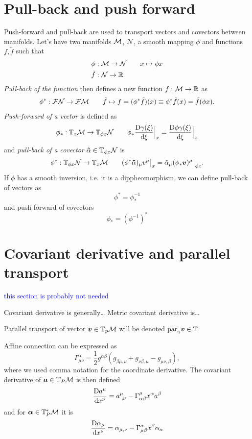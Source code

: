 \section{Pull-back and push forward}
Push-forward and pull-back are used to transport vectors and covectors between manifolds. Let's have two manifolds $\mathcal{M}$, $\mathcal{N}$, a smooth mapping $\phi$ and functions $f,\tilde f$ such that
\begin{align*}
    \phi&:\mathcal{M}\rightarrow \mathcal{N}\qquad x\mapsto \phi x\\
    \tilde f&:\mathcal{N}\rightarrow \mathbb{R} 
\end{align*}
\emph{Pull-back of the function} then defines a new function $
f:\mathcal{M}\rightarrow \mathbb{R} $ as
$$\phi^*:\mathcal{F} \mathcal{N}\rightarrow \mathcal{F}\mathcal{M} \qquad  \tilde f\mapsto f=(\phi^*\tilde f)(x)\equiv \phi^*\tilde f(x) =\tilde f(\phi x).$$
\emph{Push-forward of a vector} is defined as
$$\phi_*: \mathbb{T}_x\mathcal{M} \rightarrow \mathbb{T}_{\phi x}\mathcal N\qquad \phi_* 
\frac{\mathrm{D} \gamma(\xi)}{\mathrm{d} \xi}\Big|_x=\frac{\mathrm{D} \phi \gamma(\xi)}{\mathrm{d} \xi}\Big|_x$$
and \emph{pull-back of a covector} $\bm\tilde\alpha\in \mathbb{T}_{\phi x}\mathcal N$ is
$$\phi^*: \mathbb{T}_{\phi x}\mathcal N\rightarrow \mathbb{T}_x\mathcal{M}  \qquad (\phi^*\bm \tilde\alpha)_\mu v^\mu\big|_x= \tilde\alpha_\mu (\phi_* \bm v)^\mu\big|_{\phi x}.$$
If $\phi$ has a smooth inversion, i.e. it is a dippheomorphism, we can define pull-back of vectors as
\begin{equation}
    \phi^*=\phi_*^{-1}
\end{equation}
and push-forward of covectors
\begin{equation}
    \phi_*=(\phi^{-1})^*
\end{equation}


\section{Covariant derivative and parallel transport}
\textcolor{blue}{this section is probably not needed}


Covariant derivative is generally\dots
Metric covariant derivative is\dots

Parallel transport of vector $\bm v\in \mathbb{T}_p \mathcal{M}$ will be denoted $\textrm{par}_\gamma \bm v\in \mathbb{T}_{}$

Affine connection can be expressed as
\begin{equation}
    \Gamma^{\alpha}_{\mu\nu} = \frac{1}{2}g^{\alpha \beta}\left(g_{\beta\mu,\nu}+g_{\nu\beta,\mu}-g_{\mu\nu,\beta}\right),
\end{equation}
where we used comma notation for the coordinate derivative.
The covariant derivative of $\bm a\in \mathbb{T}_P\mathcal{M}$ is then defined
\begin{equation}
    \frac{\mathrm{D} a^\mu}{\mathrm{d} x^\nu}=a_{\;,\nu}^\mu-\Gamma^\mu_{\alpha\beta} x^\alpha a^\beta 
\end{equation}
and for $\bm\alpha\in \mathbb{T}_P^*\mathcal{M}$ it is
\begin{equation}
    \frac{\mathrm{D} \alpha_\mu}{\mathrm{d} x^\nu}=\alpha_{\mu,\nu}-\Gamma^\alpha_{\mu\beta}x^\beta \alpha_\alpha 
\end{equation}

